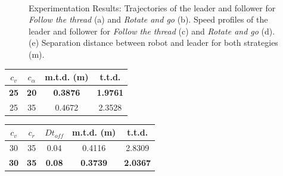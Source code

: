 \documentclass[journal]{IEEEtran}
\begin{document}
\begin{figure}
    \\
    \vspace*{-1.8em}
  \caption{Experimentation Results: Trajectories of the leader and follower for \textit{Follow the thread} (a) and \textit{Rotate and go} (b). 
        Speed profiles of the leader and follower for \textit{Follow the thread} (c) and \textit{Rotate and go} (d). 
        (e) Separation distance between robot and leader for both strategies (m).}
  \label{fig:realworldresults} 
\end{figure}


\begin{center}
\begin{tabular}{ |c|c|c|c| }
\hline
$c_v$ & $c_{\alpha}$ & m.t.d. (m) & t.t.d. \\
\hline
\textbf{25}  &   \textbf{20}  & \textbf{0.3876} & \textbf{1.9761}\\
25  &   35  & 0.4672 & 2.3528\\
\hline
\end{tabular}
\label{tab:cap_ft_npd_table}
\end{center}


\begin{center}
\begin{tabular}{ |c|c|c|c|c| }
\hline
$c_v$ & $c_r$ & $Dt_{off}$ & m.t.d. (m) & t.t.d. \\
\hline
30  &   35  & 0.04  & 0.4116 & 2.8309\\
\textbf{30}  &   \textbf{35}  & \textbf{0.08 }& \textbf{0.3739} & \textbf{2.0367}\\
\hline

\end{tabular}
\label{tab:cap_rg_npd_table}
\end{center}
\end{document}
